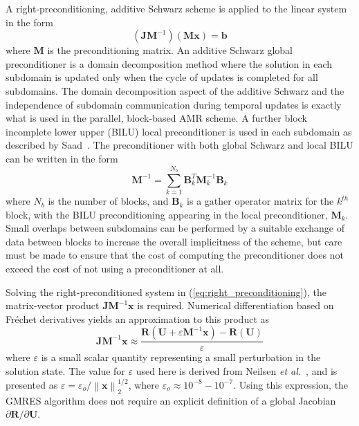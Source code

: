 \documentclass[titlepage,11pt,letterpaper]{article}
\begin{document}
A right-preconditioning, additive Schwarz scheme is applied to the linear system in the 
form
%
\begin{equation}\label{eq:right_preconditioning}
\left(\mathbf{JM}^{-1}\right)\left(\mathbf{Mx}\right)=\mathbf b
\end{equation}
%
where $\mathbf M$ is the preconditioning matrix. An additive Schwarz global preconditioner 
is a domain decomposition method where the solution in each subdomain is updated only when 
the cycle of updates is completed for all subdomains. The domain decomposition aspect of 
the additive Schwarz and the independence of subdomain communication during temporal 
updates is exactly what is used in the parallel, block-based AMR scheme. A further block 
incomplete lower upper (BILU) local preconditioner is used in each subdomain as described by 
Saad~\cite{saad:1996}. The preconditioner with both global Schwarz and local BILU can be 
written in the form
%
\begin{equation}\label{eq:precon_matrix}
\mathbf M^{-1}=\sum_{k=1}^{N_b}{\mathbf B^T_k \mathbf M^{-1}_k \mathbf B_k}
\end{equation}
%
where $N_b$ is the number of blocks, and $\mathbf B_k$ is a gather operator matrix for the 
$k^{th}$ block, with the BILU preconditioning appearing in the local preconditioner, 
$\mathbf M_k$. Small overlaps between subdomains can be performed by a suitable exchange of 
data between blocks to increase the overall implicitness of the scheme, but care must be 
made to ensure that the cost of computing the preconditioner does not exceed the cost of not 
using a preconditioner at all.

Solving the right-preconditioned system in (\ref{eq:right_preconditioning}), the 
matrix-vector product $\mathbf{JM}^{-1}\mathbf x$ is required. Numerical differentiation 
based on Fr\'{e}chet derivatives yields an approximation to this product as
%
\begin{equation}\label{eq:frechet}
\mathbf {JM}^{-1}\mathbf x
\approx \frac{\mathbf R\left(\mathbf U+\varepsilon\mathbf M^{-1}\mathbf x\right)-\mathbf R\left(\mathbf U\right)}
{\varepsilon}
\end{equation}
%
where $\varepsilon$ is a small scalar quantity representing a small perturbation in the 
solution state. The value for $\varepsilon$ used here is derived from Neilsen 
\textit{et al.}~\cite{nielsen:1995}, and is presented as 
$\varepsilon=\varepsilon_o/\left\|\mathbf x\right\|^{1/2}_2$, where 
$\varepsilon_o\approx 10^{-8}-10^{-7}$. Using this expression, the GMRES algorithm does not 
require an explicit definition of a global Jacobian $\partial\mathbf R/\partial\mathbf U$. 
\end{document}
